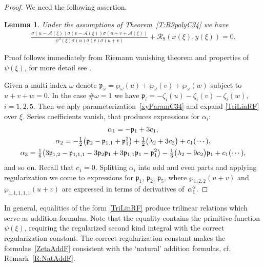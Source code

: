 \documentclass[pdftex]{sigma}
\numberwithin{equation}{section}
\newtheorem{Lemma}[Theorem]{Lemma}
\begin{document}
\begin{proof}
We need the following assertion.
\begin{Lemma}%
Under the assumptions of Theorem~{\rm \ref{T:R9polyC34}} we have
 \begin{gather}\label{TriLinRF}
 \frac{\sigma(u-\mathcal{A}(\xi))\sigma(v-\mathcal{A}(\xi))\sigma(u+v+\mathcal{A}(\xi))} {\psi^3(\xi) \sigma(u)\sigma(v)\sigma(u+v)} + \mathcal{R}_9(x(\xi),y(\xi)) = 0.
 \end{gather}
\end{Lemma}
Proof follows immediately from Riemann vanishing theorem and properties of $\psi(\xi)$, for more detail see \cite{BL2005}.

Given a multi-index $\omega$ denote $\mathfrak{p}_{\omega}= \wp_{\omega}(u) + \wp_{\omega}(v) + \wp_{\omega}(w)$ {subject to} $u+v+w=0$. In the case $\# \omega =1$ we have $\mathfrak{p}_{i}= -\zeta_{i}(u) - \zeta_{i}(v) - \zeta_{i}(w)$, $i=1,2,5$. Then we aply parameteriza\-tion~\eqref{xyParamC34} and expand \eqref{TriLinRF} over $\xi$. Series coefficients vanish, that produces expressions for $\alpha_i$:
\begin{gather*}
 \alpha_1 = - \mathfrak{p}_1 + 3c_1, \notag\\
 \alpha_2 = - \tfrac{1}{2}\big(\mathfrak{p}_2-\mathfrak{p}_{1,1}+\mathfrak{p}_1^2\big) + \tfrac{1}{2}\big(\lambda_2 + 3c_2 \big) + c_1(\cdots ),\notag \\
 \alpha_3 = \tfrac{1}{6}\big(3\mathfrak{p}_{1,2}-\mathfrak{p}_{1,1,1} - 3 \mathfrak{p}_{2}\mathfrak{p}_{1} + 3\mathfrak{p}_{1,1}\mathfrak{p}_{1}-\mathfrak{p}_{1}^2\big)
 -\tfrac{1}{6} \big(\lambda_2 - 9 c_2 \big)\mathfrak{p}_1 + c_1(\cdots),%
\end{gather*}
and so on. {Recall that $c_1=0$. Splitting} $\alpha_i$ into odd and even parts and applying regularization we come to expressions for $\mathfrak{p}_{1}$, $\mathfrak{p}_{2}$, $\mathfrak{p}_{5}$, where $\wp_{1,2,2}(u+v)$ and $\wp_{1,1,1,1,1}(u+v)$ are expressed in terms of derivatives of~$\alpha_1^{{\rm o}}$.
\end{proof}

\begin{Remark}In general, equalities of the form \eqref{TriLinRF} produce trilinear relations which serve as addition formulas. Note that the equality contains the primitive function $\psi(\xi)$, requiring the regularized second kind integral with the correct regularization constant. The correct regula\-ri\-za\-tion constant makes the formulas~\eqref{ZetaAddF} consistent with the `natural' addition formulas, cf. Remark~\ref{R:NatAddF}.
\end{Remark}
\end{document}

